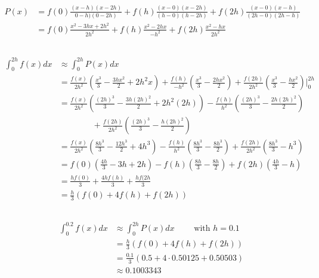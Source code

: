 \documentclass[11pt]{article}
\begin{document}
\renewcommand{\thesubsection}{\thesection.\alph{subsection}}
\section{} %
\subsection{} %
\begin{align*}
	P(x)&=f(0)\frac{(x-h)(x-2h)}{0-h)(0-2h)}+f(h)\frac{(x-0)(x-2h)}{(h-0)(h-2h)}+f(2h)\frac{(x-0)(x-h)}{(2h-0)(2h-h)}\\
	&=f(0)\frac{x^2-3hx+2h^2}{2h^2}+f(h)\frac{x^2-2hx}{-h^2}+f(2h)\frac{x^2-hx}{2h^2}
\end{align*}


\subsection{} %
\begin{align*}
	\int_0^{2h}f(x)dx&\approx\int_0^{2h}P(x)dx\\
	&=\frac{f(x)}{2h^2}\left(\frac{x^3}{3}-\frac{3hx^2}{2}+2h^2x\right)
	+\frac{f(h)}{-h^2}\left(\frac{x^3}{3}-\frac{2hx^2}{2}\right)
	+\frac{f(2h)}{2h^2}\left(\frac{x^3}{3}-\frac{hx^2}{2}\right)\Bigg\rvert_0^{2h}\\
	&=\frac{f(x)}{2h^2}\left(\frac{(2h)^3}{3}-\frac{3h(2h)^2}{2}+2h^2(2h)\right)
	-\frac{f(h)}{h^2}\left(\frac{(2h)^3}{3}-\frac{2h(2h)^2}{2}\right)\\
	&\qquad\qquad+\frac{f(2h)}{2h^2}\left(\frac{(2h)^3}{3}-\frac{h(2h)^2}{2}\right)\\
	&=\frac{f(x)}{2h^2}\left(\frac{8h^3}{3}-\frac{12h^3}{2}+4h^3\right)
	-\frac{f(h)}{h^2}\left(\frac{8h^3}{3}-\frac{8h^3}{2}\right)
	+\frac{f(2h)}{2h^2}\left(\frac{8h^3}{3}-h^3\right)\\
	&=f(0)\left(\frac{4h}{3}-3h+2h\right)-f(h)\left(\frac{8h}{3}-\frac{8h}{2}\right)+f(2h)\left(\frac{4h}{3}-h\right)\\
	&=\frac{hf(0)}{3}+\frac{4hf(h)}{3}+\frac{hf(2h}{3}\\
	&=\frac{h}{3}\left(f(0)+4f(h)+f(2h)\right)
\end{align*}


\subsection{} %
\begin{align*}
	\int_0^{0.2}f(x)dx&\approx\int_0^{2h}P(x)dx\qquad\text{ with $h=0.1$}\\
	&=\frac{h}{3}\left(f(0)+4f(h)+f(2h)\right)\\
	&=\frac{0.1}{3}\left(0.5+4\cdot0.50125+0.50503\right)\\
	&\approx0.1003343
\end{align*}
\end{document}
